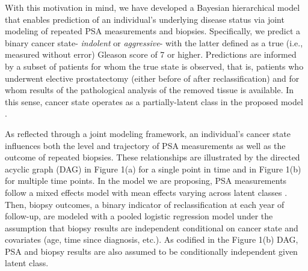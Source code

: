 \documentclass[12pt, letterpaper]{article}
\begin{document}
With this motivation in mind, we have developed a Bayesian hierarchical model that enables prediction of an individual's underlying disease status via joint modeling of repeated PSA measurements and biopsies. Specifically, we predict a binary cancer state- \textit{indolent} or \textit{aggressive}- with the latter defined as a true (i.e., measured without error) Gleason score of 7 or higher. Predictions are informed by a subset of patients for whom the true state is observed, that is, patients who underwent elective prostatectomy (either before of after reclassification) and for whom results of the pathological analysis of the removed tissue is available. In this sense, cancer state operates as a partially-latent class in the proposed model \cite{Wu2015}. 

As reflected through a joint modeling framework, an individual's cancer state influences both the level and trajectory of PSA measurements as well as the outcome of repeated biopsies. These relationships are illustrated by the directed acyclic graph (DAG) in Figure 1(a) for a single point in time and in Figure 1(b) for multiple time points. In the model we are proposing, PSA measurements follow a mixed effects model with mean effects varying across latent classes \cite{Laird1982}. Then, biopsy outcomes, a binary indicator of reclassification at each year of follow-up, are modeled with a pooled logistic regression model under the assumption that biopsy results are independent conditional on cancer state and covariates (age, time since diagnosis, etc.)\cite{Cupples1988,D'Agostino1990}. As codified in the Figure 1(b) DAG, PSA and biopsy results are also assumed to be conditionally independent given latent class. 
\end{document}
